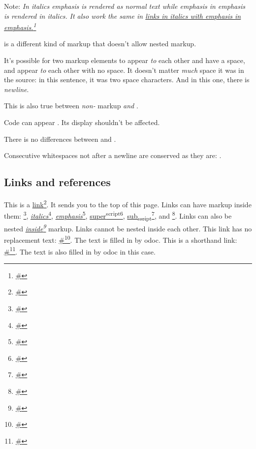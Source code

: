 Note: \emph{In italics \emph{emphasis} is rendered as normal text while \emph{emphasis \emph{in} emphasis} is rendered in italics.} \emph{It also work the same in \href{\#}{links in italics with \emph{emphasis \emph{in} emphasis}.}\footnote{\url{\#}}}

 is a different kind of markup that doesn't allow nested markup.

It's possible for two markup elements to appear  \emph{to} each other and have a space, and appear \emph{to} each other with no space. It doesn't matter  \emph{much} space it was in the source: in this sentence, it was two space characters. And in this one, there is  \emph{newline}.

This is also true between \emph{non-} markup \emph{and} .

Code can appear . Its display shouldn't be affected.

There is no differences between  and .

Consecutive whitespaces not after a newline are conserved as they are: .

\subsection{Links and references\label{links-and-references}}%
This is a \href{\#}{link}\footnote{\url{\#}}. It sends you to the top of this page. Links can have markup inside them: \href{\#}{}\footnote{\url{\#}}, \href{\#}{\emph{italics}}\footnote{\url{\#}}, \href{\#}{\emph{emphasis}}\footnote{\url{\#}}, \href{\#}{super\textsuperscript{script}}\footnote{\url{\#}}, \href{\#}{sub\textsubscript{script}}\footnote{\url{\#}}, and \href{\#}{}\footnote{\url{\#}}. Links can also be nested \emph{\href{\#}{inside}\footnote{\url{\#}}} markup. Links cannot be nested inside each other. This link has no replacement text: \href{\#}{\#}\footnote{\url{\#}}. The text is filled in by odoc. This is a shorthand link: \href{\#}{\#}\footnote{\url{\#}}. The text is also filled in by odoc in this case.

